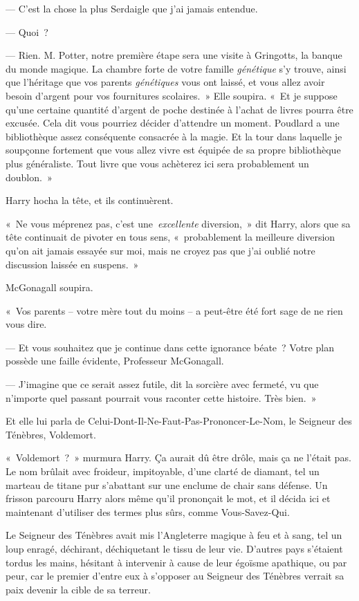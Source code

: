 --- C'est la chose la plus Serdaigle que j'ai jamais entendue.

--- Quoi~?

--- Rien. M. Potter, notre première étape sera une visite à Gringotts, la banque du monde magique. La chambre forte de votre famille \emph{génétique} s'y trouve, ainsi que l'héritage que vos parents \emph{génétiques} vous ont laissé, et vous allez avoir besoin d'argent pour vos fournitures scolaires.~» Elle soupira. «~Et je suppose qu'une certaine quantité d'argent de poche destinée à l'achat de livres pourra être excusée. Cela dit vous pourriez décider d'attendre un moment. Poudlard a une bibliothèque assez conséquente consacrée à la magie. Et la tour dans laquelle je soupçonne fortement que vous allez vivre est équipée de sa propre bibliothèque plus généraliste. Tout livre que vous achèterez ici sera probablement un doublon.~»

Harry hocha la tête, et ils continuèrent.

«~Ne vous méprenez pas, c'est une~\emph{excellente} diversion,~» dit Harry, alors que sa tête continuait de pivoter en tous sens, «~probablement la meilleure diversion qu'on ait jamais essayée sur moi, mais ne croyez pas que j'ai oublié notre discussion laissée en suspens.~»

McGonagall soupira.

«~Vos parents -- votre mère tout du moins -- a peut-être été fort sage de ne rien vous dire.

--- Et vous souhaitez que je continue dans cette ignorance béate~? Votre plan possède une faille évidente, Professeur McGonagall.

--- J'imagine que ce serait assez futile, dit la sorcière avec fermeté, vu que n'importe quel passant pourrait vous raconter cette histoire. Très bien.~»

Et elle lui parla de Celui-Dont-Il-Ne-Faut-Pas-Prononcer-Le-Nom, le Seigneur des Ténèbres, Voldemort.

«~Voldemort~?~» murmura Harry. Ça aurait dû être drôle, mais ça ne l'était pas. Le nom brûlait avec froideur, impitoyable, d'une clarté de diamant, tel un marteau de titane pur s'abattant sur une enclume de chair sans défense. Un frisson parcouru Harry alors même qu'il prononçait le mot, et il décida ici et maintenant d'utiliser des termes plus sûrs, comme Vous-Savez-Qui.

Le Seigneur des Ténèbres avait mis l'Angleterre magique à feu et à sang, tel un loup enragé, déchirant, déchiquetant le tissu de leur vie. D'autres pays s'étaient tordus les mains, hésitant à intervenir à cause de leur égoïsme apathique, ou par peur, car le premier d'entre eux à s'opposer au Seigneur des Ténèbres verrait sa paix devenir la cible de sa terreur.

